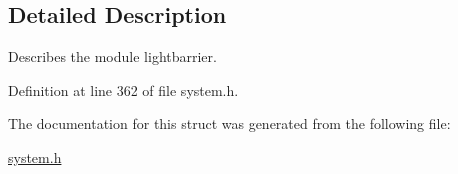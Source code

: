 \subsection{Detailed Description}
Describes the module lightbarrier. 

Definition at line 362 of file system.h.

The documentation for this struct was generated from the following file:\begin{CompactItemize}
\item 
\hyperlink{system_8h}{system.h}\end{CompactItemize}
